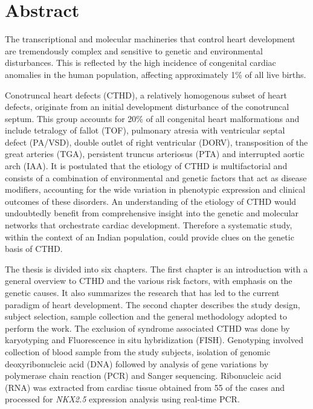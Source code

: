 \section*{Abstract}


\clearpage


The transcriptional and molecular machineries that control heart development are tremendously complex and sensitive to genetic and environmental disturbances. This is reflected by the high incidence of congenital cardiac anomalies in the human population, affecting approximately 1\% of all live births. 

Conotruncal heart defects (CTHD), a relatively homogenous subset of heart defects, originate from an initial development disturbance of the conotruncal septum. This group accounts for 20\% of all congenital heart malformations and include tetralogy of fallot (TOF), pulmonary atresia with ventricular septal defect (PA/VSD), double outlet of right ventricular (DORV), transposition of the great arteries (TGA), persistent truncus arteriosus (PTA) and interrupted aortic arch (IAA). It is postulated that the etiology of CTHD is multifactorial and consists of a combination of environmental and genetic factors that act as disease modifiers, accounting for the wide variation in phenotypic expression and clinical outcomes of these disorders. An understanding of the etiology of CTHD would undoubtedly benefit from comprehensive insight into the genetic and molecular networks that orchestrate cardiac development. Therefore a systematic study, within the context of an Indian population, could provide clues on the genetic basis of CTHD. 

The thesis is divided into six chapters. The first chapter is an introduction with a general overview to CTHD and the various risk factors, with emphasis on the genetic causes. It also summarizes the research that has led to the current paradigm of heart development. The second chapter describes the study design, subject selection, sample collection and the general methodology adopted to perform the work. The exclusion of syndrome associated CTHD was done by karyotyping and Fluorescence in situ hybridization (FISH). Genotyping involved collection of blood sample from the study subjects, isolation of genomic deoxyribonucleic acid (DNA) followed by analysis of gene variations by polymerase chain reaction (PCR) and Sanger sequencing. Ribonucleic acid (RNA) was extracted from cardiac tissue obtained from 55 of the cases and processed for \textit{NKX2.5} expression analysis using real-time PCR.

